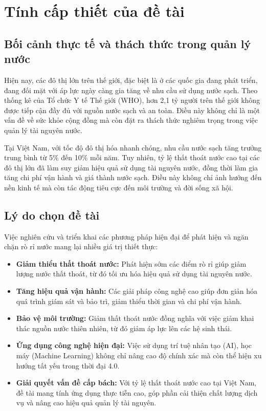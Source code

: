 \section{Tính cấp thiết của đề tài}
\subsection{Bối cảnh thực tế và thách thức trong quản lý nước}
Hiện nay, các đô thị lớn trên thế giới, đặc biệt là ở các quốc gia đang phát triển, đang đối mặt với áp lực ngày càng gia tăng về nhu cầu sử dụng nước sạch. Theo thống kê của Tổ chức Y tế Thế giới (WHO), hơn 2,1 tỷ người trên thế giới không được tiếp cận đầy đủ với nguồn nước sạch và an toàn\cite{WHO_JMP_2023}. Điều này không chỉ là một vấn đề về sức khỏe cộng đồng mà còn đặt ra thách thức nghiêm trọng trong việc quản lý tài nguyên nước.

Tại Việt Nam, với tốc độ đô thị hóa nhanh chóng, nhu cầu nước sạch tăng trưởng trung bình từ 5\% đến 10\% mỗi năm\cite{MOC_NhuCauNuocSinhHoat}. Tuy nhiên, tỷ lệ thất thoát nước cao tại các đô thị lớn đã làm suy giảm hiệu quả sử dụng tài nguyên nước, đồng thời làm gia tăng chi phí vận hành và giá thành nước sạch. Điều này không chỉ ảnh hưởng đến nền kinh tế mà còn tác động tiêu cực đến môi trường và đời sống xã hội.

\subsection{Lý do chọn đề tài}
Việc nghiên cứu và triển khai các phương pháp hiện đại để phát hiện và ngăn chặn rò rỉ nước mang lại nhiều giá trị thiết thực:
\begin{itemize}
    \item \textbf{Giảm thiểu thất thoát nước:} Phát hiện sớm các điểm rò rỉ giúp giảm lượng nước thất thoát, từ đó tối ưu hóa hiệu quả sử dụng tài nguyên nước.
    \item \textbf{Tăng hiệu quả vận hành:} Các giải pháp công nghệ cao giúp đơn giản hóa quá trình giám sát và bảo trì, giảm thiểu thời gian và chi phí vận hành.
    \item \textbf{Bảo vệ môi trường:} Giảm thất thoát nước đồng nghĩa với việc giảm khai thác nguồn nước thiên nhiên, từ đó giảm áp lực lên các hệ sinh thái.
    \item \textbf{Ứng dụng công nghệ hiện đại:} Việc sử dụng trí tuệ nhân tạo (AI), học máy (Machine Learning) không chỉ nâng cao độ chính xác mà còn thể hiện xu hướng tất yếu trong thời đại 4.0.
    \item \textbf{Giải quyết vấn đề cấp bách:} Với tỷ lệ thất thoát nước cao tại Việt Nam, đề tài mang tính ứng dụng thực tiễn cao, góp phần cải thiện chất lượng dịch vụ và nâng cao hiệu quả quản lý tài nguyên.
\end{itemize}

